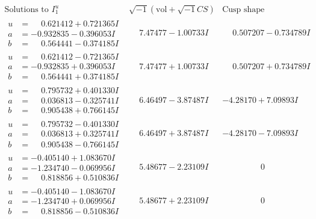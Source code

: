 \documentclass[1p]{elsarticle_modified}
\theoremstyle{definition}
\newcommand{\I}{\sqrt{-1}}
\begin{document}
$$\begin{array}{c|c|c}  
\text{Solutions to }I^u_{1}& \I (\text{vol} + \sqrt{-1}CS) & \text{Cusp shape}\\
 \hline 
\begin{aligned}
u &= \phantom{-}0.621412 + 0.721365 I \\
a &= -0.932835 - 0.396053 I \\
b &= \phantom{-}0.564441 - 0.374185 I\end{aligned}
 & \phantom{-}7.47477 - 1.00733 I & \phantom{-}0.507207 - 0.734789 I \\ \hline\begin{aligned}
u &= \phantom{-}0.621412 - 0.721365 I \\
a &= -0.932835 + 0.396053 I \\
b &= \phantom{-}0.564441 + 0.374185 I\end{aligned}
 & \phantom{-}7.47477 + 1.00733 I & \phantom{-}0.507207 + 0.734789 I \\ \hline\begin{aligned}
u &= \phantom{-}0.795732 + 0.401330 I \\
a &= \phantom{-}0.036813 - 0.325741 I \\
b &= \phantom{-}0.905438 + 0.766145 I\end{aligned}
 & \phantom{-}6.46497 - 3.87487 I & -4.28170 + 7.09893 I \\ \hline\begin{aligned}
u &= \phantom{-}0.795732 - 0.401330 I \\
a &= \phantom{-}0.036813 + 0.325741 I \\
b &= \phantom{-}0.905438 - 0.766145 I\end{aligned}
 & \phantom{-}6.46497 + 3.87487 I & -4.28170 - 7.09893 I \\ \hline\begin{aligned}
u &= -0.405140 + 1.083670 I \\
a &= -1.234740 - 0.069956 I \\
b &= \phantom{-}0.818856 + 0.510836 I\end{aligned}
 & \phantom{-}5.48677 - 2.23109 I & \phantom{-0.000000 } 0 \\ \hline\begin{aligned}
u &= -0.405140 - 1.083670 I \\
a &= -1.234740 + 0.069956 I \\
b &= \phantom{-}0.818856 - 0.510836 I\end{aligned}
 & \phantom{-}5.48677 + 2.23109 I & \phantom{-0.000000 } 0 \\ \hline\begin{aligned}

\end{aligned}
\end{array}$$
\end{document}
